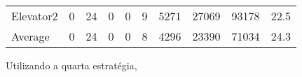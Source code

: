 \documentclass[a4paper]{article}
\begin{document}
\begin{table}[h]
\begin{tabular}{@{}llllllllll@{}}
Elevator2 & 0        & 24            & 0           & 0                                                               & 9                                                                  & 5271                                                         & 27069                                                 & 93178                                                   & 22.5         \\
Average   & 0     & 24         & 0        & 0                                                               & 8                                                               & 4296                                                         & 23390                                                 &  71034                                                  & 24.3         \\ \bottomrule
\end{tabular}
\end{table}

Utilizando a quarta estratégia,
\end{document}
